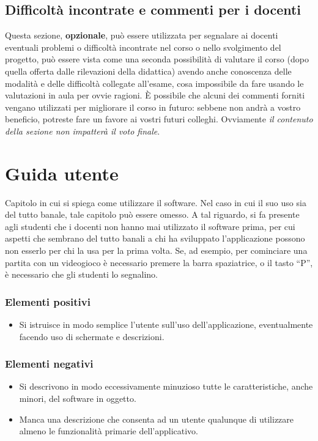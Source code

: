 \documentclass[a4paper,12pt]{report}
\begin{document}
\section{Difficoltà incontrate e commenti per i docenti}

Questa sezione, \textbf{opzionale}, può essere utilizzata per segnalare ai docenti eventuali problemi o difficoltà incontrate nel corso o nello svolgimento del progetto, può essere vista come una seconda possibilità di valutare il corso (dopo quella offerta dalle rilevazioni della didattica) avendo anche conoscenza delle modalità e delle difficoltà collegate all'esame, cosa impossibile da fare usando le valutazioni in aula per ovvie ragioni.
%
È possibile che alcuni dei commenti forniti vengano utilizzati per migliorare il corso in futuro: sebbene non andrà a vostro beneficio, potreste fare un favore ai vostri futuri colleghi.
%
Ovviamente \textit{il contenuto della sezione non impatterà il voto finale}.

\appendix
\chapter{Guida utente}

Capitolo in cui si spiega come utilizzare il software. Nel caso in cui il suo uso sia del tutto
banale, tale capitolo può essere omesso.
%
A tal riguardo, si fa presente agli studenti che i docenti non hanno mai utilizzato il software
prima, per cui aspetti che sembrano del tutto banali a chi ha sviluppato l'applicazione possono non
esserlo per chi la usa per la prima volta.
%
Se, ad esempio, per cominciare una partita con un videogioco è necessario premere la barra
spaziatrice, o il tasto ``P'', è necessario che gli studenti lo segnalino.

\subsection*{Elementi positivi}

\begin{itemize}
 \item Si istruisce in modo semplice l'utente sull'uso dell'applicazione, eventualmente facendo uso di schermate e descrizioni.
\end{itemize}

\subsection*{Elementi negativi}
\begin{itemize}
 \item Si descrivono in modo eccessivamente minuzioso tutte le caratteristiche, anche minori, del software in oggetto.
 \item Manca una descrizione che consenta ad un utente qualunque di utilizzare almeno le funzionalità primarie dell'applicativo.
\end{itemize}
\end{document}
